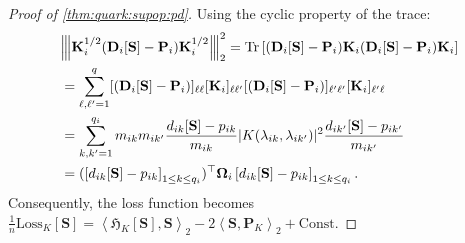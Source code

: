 \documentclass[noinfoline]{imsart}\setcounter{tocdepth}{2}
\newcommand{\m}[1]{\mathbf{#1}} %
\newcommand{\f}[1]{\mathfrak{#1}} %
\newcommand{\mb}[1]{\boldsymbol{#1}} %
\newcommand{\tr}[1]{\operatorname{Tr}\left[#1\right]}
\newcommand{\vertiii}[1]{{\left\vert\kern-0.25ex\left\vert\kern-0.25ex\left\vert #1 
    \right\vert\kern-0.25ex\right\vert\kern-0.25ex\right\vert}} %
\newcommand{\innpr}[2]{{\left\langle {#1},{#2}\right\rangle}} %
\theoremstyle{plain}
\begin{document}
\begin{appendix}
\begin{proof}[Proof of \cref{thm:quark:supop:pd}]
Using the cyclic property of the trace: 
\begin{align*} 
    &\vertiii{\m{K}_{i}^{1/2} (\m{D}_{i}[\m{S}] - \m{P}_{i}) \m{K}_{i}^{1/2}}_{2}^{2} = \tr{ (\m{D}_{i}[\m{S}] - \m{P}_{i}) \m{K}_{i} (\m{D}_{i}[\m{S}] - \m{P}_{i}) \m{K}_{i} } \\ 
    &= \sum_{\ell, \ell'=1}^{q} [(\m{D}_{i}[\m{S}] - \m{P}_{i})]_{\ell \ell} [\m{K}_{i}]_{\ell \ell'} [(\m{D}_{i}[\m{S}] - \m{P}_{i})]_{\ell' \ell'} [\m{K}_{i}]_{\ell' \ell} \\
    &= \sum_{k, k'=1}^{q_{i}} m_{ik} m_{ik'} \frac{d_{ik}[\m{S}] - p_{ik}}{m_{ik}} |K(\lambda_{ik}, \lambda_{ik'})|^{2} \frac{d_{ik'}[\m{S}] - p_{ik'}}{m_{ik'}} \\
    &= (\left[d_{i k}[\m{S}] - p_{ik}  \right]_{1 \le k \le q_{i}})^{\top} \mb{\Omega}_{i} \left[d_{i k}[\m{S}] - p_{ik}  \right]_{1 \le k \le q_{i}}.
\end{align*} 
Consequently, the loss function becomes $\tfrac{1}{n} \mathrm{Loss}_{K}[\m{S}] = \innpr{\f{H}_{K} [\m{S}]}{\m{S}}_{2} - 2 \innpr{\m{S}}{\m{P}_{K}}_{2} + \mathrm{Const.}$ 


\end{proof}
\end{appendix}
\end{document}
